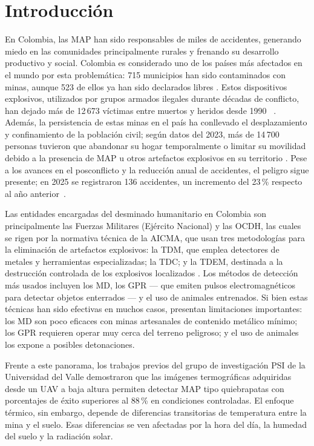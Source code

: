\chapter{Introducción}

En Colombia, las \ac{MAP} han sido responsables de miles de accidentes,
generando miedo en las comunidades principalmente rurales y frenando su
desarrollo productivo y social. Colombia es considerado uno de los países más
afectados en el mundo por esta problemática: 715 municipios han sido
contaminados con minas, aunque 523 de ellos ya han sido declarados libres
\cite{reuters2025}. Estos dispositivos explosivos, utilizados por grupos armados
ilegales durante décadas de conflicto, han dejado más de 12\,673 víctimas entre muertos y heridos desde 1990~\cite{aicma2026}
. Además, la persistencia de estas
minas en el país ha conllevado el desplazamiento y confinamiento de la población
civil; según datos del 2023, más de 14\,700 personas tuvieron que abandonar su
hogar temporalmente o limitar su movilidad debido a la presencia de \ac{MAP} u
otros artefactos explosivos en su territorio \cite{eltiempo2024}. Pese a los
avances en el posconflicto y la reducción anual de accidentes, el peligro sigue
presente; en 2025 se registraron 136 accidentes, un incremento del 23\,\% 
respecto al año anterior~\cite{aicma2026}.

Las entidades encargadas del desminado humanitario en Colombia son
principalmente las Fuerzas Militares (Ejército Nacional) y las \ac{OCDH},
las cuales se rigen por la normativa técnica de la \ac{AICMA}, que usan
tres metodologías para la eliminación de artefactos explosivos: la \ac{TDM},
que emplea detectores de metales y herramientas especializadas; la \ac{TDC};
y la \ac{TDEM}, destinada a la destrucción controlada de los explosivos
localizados \cite{forero2022}. Los métodos de detección más usados incluyen
los \ac{MD}, los \ac{GPR} --- que emiten pulsos electromagnéticos para detectar
objetos enterrados --- y el uso de animales entrenados. Si bien estas técnicas
han sido efectivas en muchos casos, presentan limitaciones importantes: los
\ac{MD} son poco eficaces con minas artesanales de contenido metálico mínimo;
los \ac{GPR} requieren operar muy cerca del terreno peligroso; y el uso de
animales los expone a posibles detonaciones.

Frente a este panorama, los trabajos previos del grupo de investigación \ac{PSI}
de la Universidad del Valle \cite{forero2022,tenorio2024} demostraron que las
imágenes termográficas adquiridas desde un \ac{UAV} a baja altura permiten
detectar \ac{MAP} tipo quiebrapatas con porcentajes de éxito superiores al 88\,\%
en condiciones controladas. El enfoque térmico, sin embargo, depende de diferencias transitorias de
temperatura entre la mina y el suelo. Esas diferencias se ven afectadas
por la hora del día, la humedad del suelo y la radiación solar.

